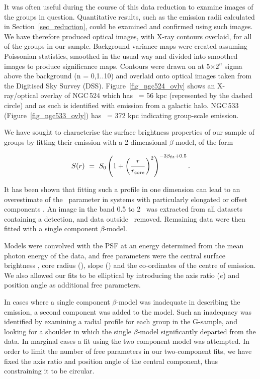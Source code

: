 \documentclass[usenatbib]{mn2e}
\begin{document}
It was often useful during the course of this data reduction to examine images of
the groups in question.  Quantitative results, such as the emission radii
calculated in Section~\ref{sec_reduction}, could be examined and confirmed using
such images.  We have therefore produced optical images, with X-ray contours
overlaid, for all of the groups in our sample.  Background variance maps were
created assuming Poissonian statistics, smoothed in the usual way and divided
into smoothed images to produce significance maps.  Contours were drawn on at
5$\times2^{n}$ sigma above the background (n = 0,1..10) and overlaid onto optical
images taken from the Digitised Sky Survey (DSS).  Figure~\ref{fig_ngc524_ovly}
shows an X-ray/optical overlay of NGC\,524 which has \rcut\ = 56 kpc (represented
by the dashed circle) and as such is identified with emission from a galactic
halo. NGC\,533 (Figure~\ref{fig_ngc533_ovly}) has \rcut\ = 372 kpc indicating
group-scale emission.

We have sought to characterise the surface brightness properties of our sample of
groups by fitting their emission with a 2-dimensional $\beta$-model, of the form

\begin{equation}
S(r) ~ = ~ S_{\mathrm{0}} \left(1+ \left(\frac{r}{r_{\mathrm{core}}}\right)^2\right)^{ -3 \beta_{\mathrm{fit}} + 0.5}.
\label{eqn_sr}
\end{equation}

\noindent It has been shown that fitting such a profile in one dimension can lead
to an overestimate of the \betafit\ parameter in systems with particularly
elongated or offset components \citep{helsdon00a}.  An image in the band 0.5 to 2
\kev\ was extracted from all datasets containing a detection, and data outside
\rcut\ removed.  Remaining data were then fitted with a single component
$\beta$-model.

Models were convolved with the PSF at an energy determined from the mean photon
energy of the data, and free parameters were the central surface brightness
\Szero, core radius (\rcore), slope (\betafit) and the co-ordinates of
the centre of emission. We also allowed our fits to be elliptical by introducing
the axis ratio ($e$) and position angle as additional free parameters.

In cases where a single component $\beta$-model was inadequate in describing the
emission, a second component was added to the model.  Such an inadequacy was
identified by examining a radial profile for each group in the G-sample, and
looking for a shoulder in which the single $\beta$-model significantly departed
from the data.  In marginal cases a fit using the two component model was
attempted.  In order to limit the number of free parameters in our two-component
fits, we have fixed the axis ratio and position angle of the central component,
thus constraining it to be circular.
\end{document}
